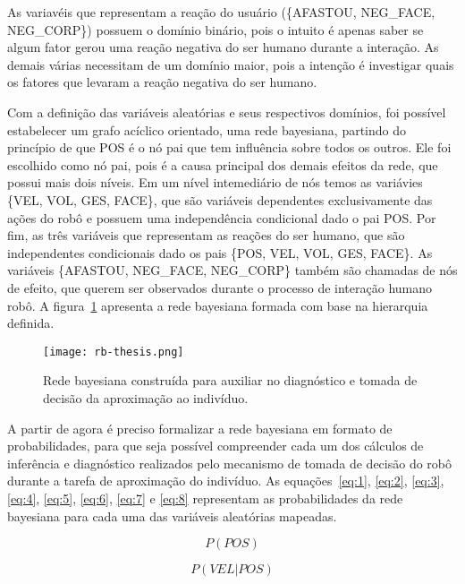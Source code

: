 As variavéis que representam a reação do usuário (\{AFASTOU, NEG\_FACE, NEG\_CORP\}) possuem o domínio binário, pois o intuito é apenas saber se algum fator gerou uma reação negativa do ser humano durante a interação. As demais várias necessitam de um domínio maior, pois a intenção é investigar quais os fatores que levaram a reação negativa do ser humano.

Com a definição das variáveis aleatórias e seus respectivos domínios, foi possível estabelecer um grafo acíclico orientado, uma rede bayesiana, partindo do princípio de que POS é o nó pai que tem influência sobre todos os outros. Ele foi escolhido como nó pai, pois é a causa principal dos demais efeitos da rede, que possui mais dois níveis. Em um nível intemediário de nós temos as variávies \{VEL, VOL, GES, FACE\}, que são variáveis dependentes exclusivamente das ações do robô e possuem uma independência condicional dado o pai POS. Por fim, as três variáveis que representam as reações do ser humano, que são independentes condicionais dado os pais \{POS, VEL, VOL, GES, FACE\}. As variáveis \{AFASTOU, NEG\_FACE, NEG\_CORP\} também são chamadas de nós de efeito, que querem ser observados durante o processo de interação humano robô. A figura~\ref{fig:rb} apresenta a rede bayesiana formada com base na hierarquia definida.

\begin{figure}[ht!]
	\centering
	\begin{minipage}{0.8\textwidth}
		\caption{Rede bayesiana construída para auxiliar no diagnóstico e tomada de decisão da aproximação ao indivíduo.}
		\texttt{[image: rb-thesis.png]}
		\label{fig:rb}
	\end{minipage}
\end{figure}

A partir de agora é preciso formalizar a rede bayesiana em formato de probabilidades, para que seja possível compreender cada um dos cálculos de inferência e diagnóstico realizados pelo mecanismo de tomada de decisão do robô durante a tarefa de aproximação do indivíduo. As equações~\ref{eq:1}, \ref{eq:2}, \ref{eq:3}, \ref{eq:4}, \ref{eq:5}, \ref{eq:6}, \ref{eq:7} e \ref{eq:8} representam as probabilidades da rede bayesiana para cada uma das variáveis aleatórias mapeadas.

\begin{equation}
	\label{eq:1}
	P(POS)
\end{equation}

\begin{equation}
	\label{eq:2}
	P(VEL|POS)
\end{equation}

